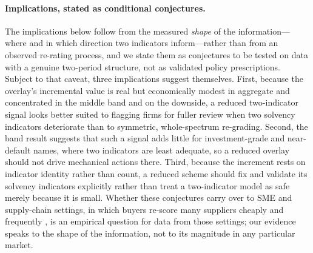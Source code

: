 \documentclass[pdflatex,sn-mathphys-ay]{sn-jnl}
\begin{document}
\paragraph{Implications, stated as conditional conjectures.} The implications below follow from the
measured \emph{shape} of the information---where and in which direction two indicators inform---rather
than from an observed re-rating process, and we state them as conjectures to be tested on data with a
genuine two-period structure, not as validated policy prescriptions. Subject to that caveat, three
implications suggest themselves. First, because the overlay's incremental value is real but
economically modest in aggregate and concentrated in the middle band and on the downside, a reduced
two-indicator signal looks better suited to flagging firms for fuller review when two solvency
indicators deteriorate than to symmetric, whole-spectrum re-grading. Second, the band result suggests
that such a signal adds little for investment-grade and near-default names, where two indicators are
least adequate, so a reduced overlay should not drive mechanical actions there. Third, because the
increment rests on indicator identity rather than count, a reduced scheme should fix and validate its
solvency indicators explicitly rather than treat a two-indicator model as safe merely because it is
small. Whether these conjectures carry over to SME and supply-chain settings, in which buyers re-score
many suppliers cheaply and frequently \citep{altman2005emerging,berger2006,giannetti2011}, is an
empirical question for data from those settings; our evidence speaks to the shape of the information,
not to its magnitude in any particular market.
\end{document}
